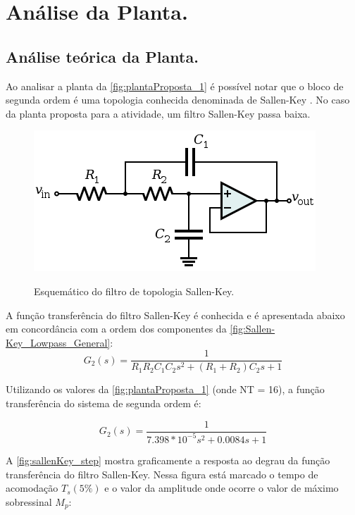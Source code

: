 \documentclass[
	article,			%
	11pt,				%
	oneside,			%
	a4paper,			%
	english,			%
	brazil,				%
	sumario=tradicional
	]{abntex2}
\begin{document}
\pagebreak

\section{\textbf{Análise da Planta.}}

\subsection{Análise teórica da Planta.}

Ao analisar a planta da \autoref{fig:plantaProposta_1} é possível notar que o bloco de segunda ordem é uma topologia conhecida denominada de Sallen-Key \cite{sadiku2013}. 
No caso da planta proposta para a atividade, um filtro Sallen-Key passa baixa.

\begin{figure}[htb!]
	\centering
	\caption{Esquemático do filtro de topologia Sallen-Key.}
	\includegraphics[scale=0.45]{./img/Sallen-Key_Lowpass_General.png}
	\label{fig:Sallen-Key_Lowpass_General}
\end{figure}

A função transferência do filtro Sallen-Key é conhecida e é apresentada abaixo em concordância com a ordem dos componentes da \autoref{fig:Sallen-Key_Lowpass_General}:
$$
	G_{2}(s) = \frac{1}{R_1R_2C_1C_2s^2 + (R_1+R_2)C_2s + 1}
$$

Utilizando os valores da \autoref{fig:plantaProposta_1} (onde NT = 16), a função transferência do sistema de segunda ordem é:

$$
	G_{2}(s) = \frac{1}{7.398*10^{-5}s^2 + 0.0084s + 1}
$$

A \autoref{fig:sallenKey_step} mostra graficamente a resposta ao degrau da função transferência do filtro Sallen-Key. Nessa figura está marcado o tempo de acomodação $T_s (5\%)$ e o valor da amplitude onde ocorre o valor de máximo sobressinal $M_p$:
\end{document}
